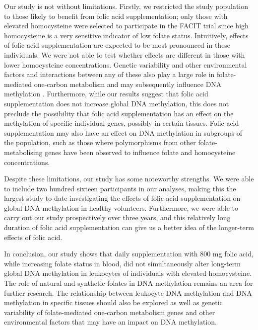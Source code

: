 \noindent Our study is not without limitations. Firstly, we restricted the study population to those likely to benefit from folic acid supplementation; only those with elevated homocysteine were selected to participate in the FACIT trial since high homocysteine is a very sensitive indicator of low folate status. Intuitively, effects of folic acid supplementation are expected to be most pronounced in these individuals. We were not able to test whether effects are different in those with lower homocysteine concentrations. Genetic variability and other environmental factors and interactions between any of these also play a large role in folate-mediated one-carbon metabolism \cite{c444} and may subsequently influence DNA methylation \cite{c445}. Furthermore, while our results suggest that folic acid supplementation does not increase global DNA methylation, this does not preclude the possibility that folic acid supplementation has an effect on the methylation of specific individual genes, possibly in certain 
tissues. Folic acid supplementation may also have an effect on DNA methylation in subgroups of the population, such as those where polymorphisms from other folate-metabolising genes have been observed to influence folate \cite{c446} and homocysteine \cite{c446,c447} concentrations.

\noindent Despite these limitations, our study has some noteworthy strengths. We were able to include two hundred sixteen participants in our analyses, making this the largest study to date investigating the effects of folic acid supplementation on global DNA methylation in healthy volunteers. Furthermore, we were able to carry out our study prospectively over three years, and this relatively long duration of folic acid supplementation can give us a better idea of the longer-term effects of folic acid.

\noindent In conclusion, our study shows that daily supplementation with 800 mg folic acid, while increasing folate status in blood, did not simultaneously alter long-term global DNA methylation in leukocytes of individuals with elevated homocysteine. The role of natural and synthetic folates in DNA methylation remains an area for further research. The relationship between leukocyte DNA methylation and DNA methylation in specific tissues should also be explored as well as genetic variability of folate-mediated one-carbon metabolism genes and other environmental factors that may have an impact on DNA methylation.
 
